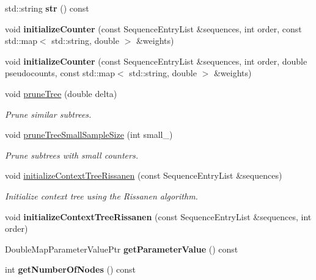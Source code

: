 \begin{DoxyCompactItemize}
std\+::string {\bfseries str} () const
\item 
\mbox{\label{classtops_1_1ContextTree_a27f33d2755c4a88b926b4f62b4e771be}} 
void {\bfseries initialize\+Counter} (const Sequence\+Entry\+List \&sequences, int order, const std\+::map$<$ std\+::string, double $>$ \&weights)
\item 
\mbox{\label{classtops_1_1ContextTree_a9cdc3597339e8d2b32a0d119cf6e3a03}} 
void {\bfseries initialize\+Counter} (const Sequence\+Entry\+List \&sequences, int order, double pseudocounts, const std\+::map$<$ std\+::string, double $>$ \&weights)
\item 
\mbox{\label{classtops_1_1ContextTree_a95a7c58675d0ce1319d9d80332f39107}} 
void \hyperlink{classtops_1_1ContextTree_a95a7c58675d0ce1319d9d80332f39107}{prune\+Tree} (double delta)
\begin{DoxyCompactList}\small\item\em Prune similar subtrees. \end{DoxyCompactList}\item 
\mbox{\label{classtops_1_1ContextTree_a85230f3ea9b9dcde50ab7d43eb211734}} 
void \hyperlink{classtops_1_1ContextTree_a85230f3ea9b9dcde50ab7d43eb211734}{prune\+Tree\+Small\+Sample\+Size} (int small\+\_\+)
\begin{DoxyCompactList}\small\item\em Prune subtrees with small counters. \end{DoxyCompactList}\item 
\mbox{\label{classtops_1_1ContextTree_a771b4b118995e586d1418de95a546690}} 
void \hyperlink{classtops_1_1ContextTree_a771b4b118995e586d1418de95a546690}{initialize\+Context\+Tree\+Rissanen} (const Sequence\+Entry\+List \&sequences)
\begin{DoxyCompactList}\small\item\em Initialize context tree using the Rissanen algorithm. \end{DoxyCompactList}\item 
\mbox{\label{classtops_1_1ContextTree_a7fbe880cbe5995544b1bbb6dd16969fd}} 
void {\bfseries initialize\+Context\+Tree\+Rissanen} (const Sequence\+Entry\+List \&sequences, int order)
\item 
\mbox{\label{classtops_1_1ContextTree_a51fed6554965f68d247d4378e6102825}} 
Double\+Map\+Parameter\+Value\+Ptr {\bfseries get\+Parameter\+Value} () const
\item 
\mbox{\label{classtops_1_1ContextTree_a444d85429a9dab2c721d100dd48ca6da}} 
int {\bfseries get\+Number\+Of\+Nodes} () const
\end{DoxyCompactItemize}


